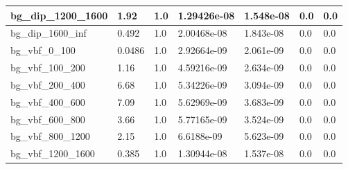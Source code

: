 \documentclass[a4paper, 10pt]{article}
\begin{document}
\begin{table}[H]
\begin{center}
\begin{tabular}{|m{23.0mm}|m{23.0mm}|m{18.0mm}|m{19.0mm}|m{19.0mm}|m{19.0mm}|m{19.0mm}|}
      \hline
      {\cellcolor{white}         bg\_dip\_1200\_1600}& {\cellcolor{white}         1.92}& {\cellcolor{white}         1.0}& {\cellcolor{white}         1.29426e-08}& {\cellcolor{white}         1.548e-08}& {\cellcolor{green}         0.0}& {\cellcolor{green}         0.0}\\
      \hline
      {\cellcolor{white}         bg\_dip\_1600\_inf}& {\cellcolor{white}         0.492}& {\cellcolor{white}         1.0}& {\cellcolor{white}         2.00468e-08}& {\cellcolor{white}         1.843e-08}& {\cellcolor{green}         0.0}& {\cellcolor{green}         0.0}\\
      \hline
      {\cellcolor{white}         bg\_vbf\_0\_100}& {\cellcolor{white}         0.0486}& {\cellcolor{white}         1.0}& {\cellcolor{white}         2.92664e-09}& {\cellcolor{white}         2.061e-09}& {\cellcolor{green}         0.0}& {\cellcolor{green}         0.0}\\
      \hline
      {\cellcolor{white}         bg\_vbf\_100\_200}& {\cellcolor{white}         1.16}& {\cellcolor{white}         1.0}& {\cellcolor{white}         4.59216e-09}& {\cellcolor{white}         2.634e-09}& {\cellcolor{green}         0.0}& {\cellcolor{green}         0.0}\\
      \hline
      {\cellcolor{white}         bg\_vbf\_200\_400}& {\cellcolor{white}         6.68}& {\cellcolor{white}         1.0}& {\cellcolor{white}         5.34226e-09}& {\cellcolor{white}         3.094e-09}& {\cellcolor{green}         0.0}& {\cellcolor{green}         0.0}\\
      \hline
      {\cellcolor{white}         bg\_vbf\_400\_600}& {\cellcolor{white}         7.09}& {\cellcolor{white}         1.0}& {\cellcolor{white}         5.62969e-09}& {\cellcolor{white}         3.683e-09}& {\cellcolor{green}         0.0}& {\cellcolor{green}         0.0}\\
      \hline
      {\cellcolor{white}         bg\_vbf\_600\_800}& {\cellcolor{white}         3.66}& {\cellcolor{white}         1.0}& {\cellcolor{white}         5.77165e-09}& {\cellcolor{white}         3.524e-09}& {\cellcolor{green}         0.0}& {\cellcolor{green}         0.0}\\
      \hline
      {\cellcolor{white}         bg\_vbf\_800\_1200}& {\cellcolor{white}         2.15}& {\cellcolor{white}         1.0}& {\cellcolor{white}         6.6188e-09}& {\cellcolor{white}         5.623e-09}& {\cellcolor{green}         0.0}& {\cellcolor{green}         0.0}\\
      \hline
      {\cellcolor{white}         bg\_vbf\_1200\_1600}& {\cellcolor{white}         0.385}& {\cellcolor{white}         1.0}& {\cellcolor{white}         1.30944e-08}& {\cellcolor{white}         1.537e-08}& {\cellcolor{green}         0.0}& {\cellcolor{green}         0.0}\\

\end{tabular}
\end{center}
\end{table}
\end{document}
